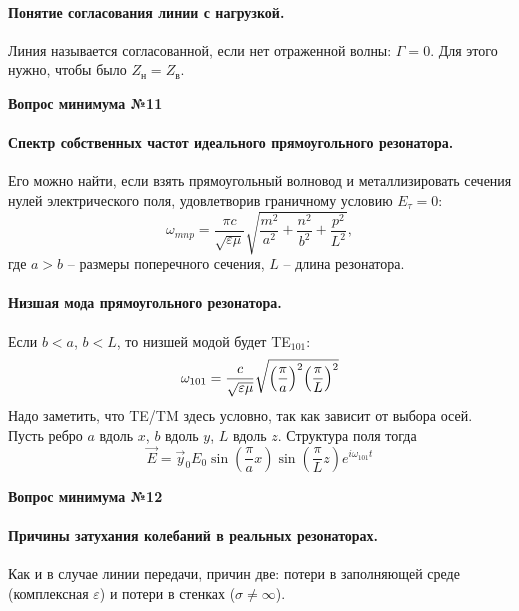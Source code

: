 \documentclass[a4paper,14pt]{extarticle}
\newcommand{\ticket}[1] {
\newpage
\hypertarget{num#1}{}
\begin{center}
	\textbf{Вопрос минимума №#1 }
\end{center}
}
\begin{document}
\paragraph{Понятие согласования линии с нагрузкой. } Линия называется согласованной, если нет отраженной волны: $\Gamma=0$. Для этого нужно, чтобы было $Z_\text{н}=Z_\text{в}$.




\ticket{11}
\paragraph{Спектр собственных частот идеального прямоугольного резонатора.} Его можно найти, если взять прямоугольный волновод и металлизировать сечения нулей электрического поля, удовлетворив граничному условию $E_\tau=0$:
\begin{equation}
	\omega_{mnp} = \frac{\pi c}{\sqrt{\varepsilon \mu}} \sqrt{\frac{m^2}{a^2}+\frac{n^2}{b^2}+\frac{p^2}{L^2}},
\end{equation}
где $a>b$ -- размеры поперечного сечения, $L$ -- длина резонатора.
\paragraph{Низшая мода прямоугольного резонатора. }%
Если $b<a$, $b<L$, то низшей модой будет TE${}_{101}$:
\begin{equation}
	\omega_{101}=\frac{c}{\sqrt{\varepsilon \mu}}\sqrt{
		\qty(\frac{\pi}{a})^2
		\qty(\frac{\pi}{L})^2
	}
\end{equation}
Надо заметить, что TE/TM здесь условно, так как зависит от выбора осей. Пусть ребро $a$ вдоль $x$, $b$ вдоль $y$, $L$ вдоль $z$.  Структура поля тогда 
\begin{equation}
	\vec{E}=\vec{y}_0 E_0 \sin(\frac{\pi}{a}x)\sin(\frac{\pi}{L}z)e^{i\omega_{101}t}
\end{equation}








\ticket{12}
\paragraph{Причины затухания колебаний в реальных резонаторах.} Как и в случае линии передачи, причин две:
потери в заполняющей среде (комплексная $\varepsilon$) и потери в стенках ($\sigma \ne \infty$).
\end{document}
